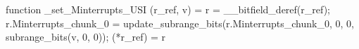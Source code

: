 function _set_Minterrupts_USI (r_ref, v) = {
    r = __bitfield_deref(r_ref);
    r.Minterrupts_chunk_0 = update_subrange_bits(r.Minterrupts_chunk_0, 0, 0, subrange_bits(v, 0, 0));
    (*r_ref) = r
}
